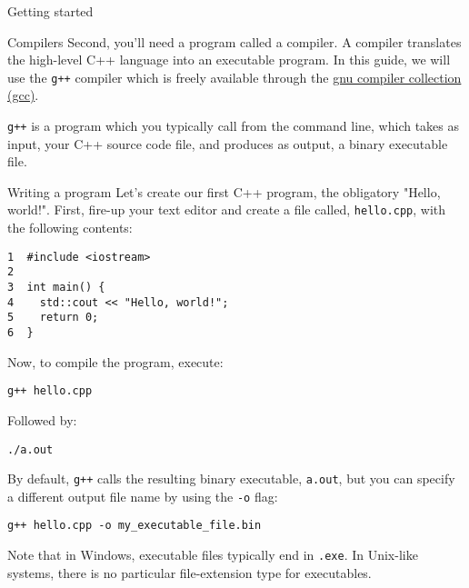 \documentclass[presentation]{beamer}
\begin{document}
\begin{frame}[fragile,label={sec:orgheadline2}]{Getting started}
\begin{block}{Compilers}
Second, you'll need a program called a \alert{compiler}. A compiler translates 
the high-level C++ language into an executable program. In this guide, we 
will use the \texttt{g++} compiler which is freely available through the 
\href{https://gcc.gnu.org/}{gnu compiler collection (gcc)}.

\texttt{g++} is a program which you typically call from the command line, which 
takes as input, your C++ source code file, and produces as output, a 
binary executable file.
\end{block}

\begin{block}{Writing a program}
Let's create our first C++ program, the obligatory "Hello, world!". First, 
fire-up your text editor and create a file called, \texttt{hello.cpp}, with the 
following contents:

\begin{verbatim}
1  #include <iostream>
2  
3  int main() {
4    std::cout << "Hello, world!";
5    return 0;
6  }
\end{verbatim}

Now, to compile the program, execute:

\begin{verbatim}
g++ hello.cpp
\end{verbatim}

Followed by:
\begin{verbatim}
./a.out
\end{verbatim}

By default, \texttt{g++} calls the resulting binary executable, \texttt{a.out}, but
you can specify a different output file name by using the \texttt{-o} flag:

\begin{verbatim}
g++ hello.cpp -o my_executable_file.bin
\end{verbatim}

Note that in Windows, executable files typically end in \texttt{.exe}. In Unix-like
systems, there is no particular file-extension type for executables.
\end{block}
\end{frame}
\end{document}
